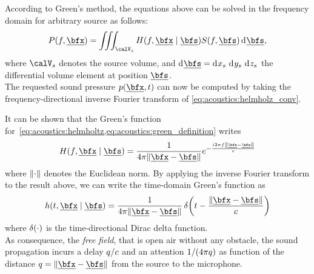 According to Green's method, the equations above can be solved in the frequency domain for arbitrary source as follows:
\begin{equation}
    \label{eq:acoustics:helmholz_conv}
    P(f, \positionMicrophone) = \iiint_{\volume_\contSource} H(f, \positionMicrophone \mid \positionSource) S(f, \positionSource) \kdiff\positionSource
    ,
\end{equation}
where $\volume_\contSource$ denotes the source volume,
and  $\kdiff\positionSource =  \kdiff{x_\contSource}\,\kdiff{y_\contSource}\,\kdiff{z_\contSource}$ the  differential  volume element at position $\positionSource$.
\\The requested sound pressure $\pressureSpaceTime$ can now be computed by taking the frequency-directional inverse Fourier transform of \cref{eq:acoustics:helmholz_conv}.

It can be shown  that the Green's function for~\cref{eq:acoustics:helmholtz,eq:acoustics:green_definition} writes
\begin{equation}
    \label{eq:acoustics:greenFreeFreq}
    H(f, \positionMicrophone \mid \positionSource) = \frac{1}{4 \pi \norm{\positionMicrophone - \positionSource}} \cste^{- \frac{\csti 2 \pi f \norm{\positionMicrophone - \positionSource}}{\speedOfSound}}
\end{equation}
where $\norm{\cdot}$ denotes the Euclidean norm.
By applying the inverse Fourier transform to the result above, we can write the time-domain Green's function as
\begin{equation}
    \label{eq:acoustics:greenFreeTime}
    h(t, \positionMicrophone \mid \positionSource) =
        \frac{1}{4 \pi \norm{\positionMicrophone - \positionSource}}
        \diracOf{t - \frac{\norm{\positionMicrophone - \positionSource}}{\speedOfSound}}
\end{equation}
where $\diracOf{\cdot}$ is the time-directional Dirac delta function.
\\As consequence, the \textit{free field}, that is open air without any obstacle, the  sound propagation incurs a delay $q / c$
and an attention $1 / (4 \pi q)$ as function of the distance
$ \distMicSrc = \norm{\positionMicrophone - \positionSource}$ from the source to the microphone.

